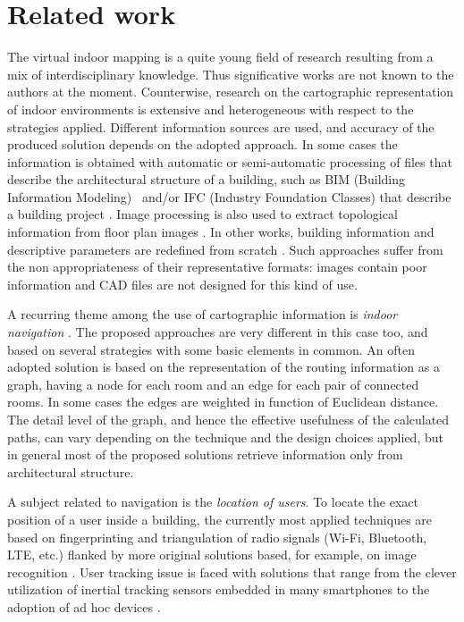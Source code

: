 \section{Related work}\label{related-work}

The virtual indoor mapping is a quite young field of research resulting from a mix of interdisciplinary knowledge. Thus significative works are not known to the authors at  the moment. Counterwise, research on the cartographic representation of indoor environments is
extensive and heterogeneous with respect to the strategies
applied. Different information sources are used, and accuracy of the
produced solution depends on the adopted approach. In some cases the
information is obtained with automatic or semi-automatic processing of files
that describe the architectural structure of a building, such as BIM (Building Information Modeling)~\cite{Eastman:2008:BHG:1796500} and/or IFC (Industry Foundation Classes) that describe a building project \cite{6816739}. Image processing is also used to
extract topological information from floor plan images \cite{6878152}. In
other works, building information and descriptive parameters are redefined
from scratch \cite{6418876}. Such approaches suffer from the non appropriateness of
their representative formats: images contain poor information and CAD
files are not designed for this kind of use. 

A recurring theme among the use
of cartographic information is \emph{indoor navigation}
\cite{6878152,6418876,6816739}. The proposed approaches are very different in
this case too, and based on several strategies with some basic elements in
common. An often adopted solution is based on the representation of the
routing information as a graph, having a node for each room and an edge for
each pair of connected rooms. In some cases the edges are weighted in
function of Euclidean distance. The detail level of the graph, and hence the
effective usefulness of the calculated paths, can vary depending on the
technique and the design choices applied, but in general most of the proposed
solutions retrieve information only from architectural structure. 

A subject related to navigation is the \emph{location of users}. To locate the exact position of a user inside a
building, the currently most applied techniques are based on fingerprinting and
triangulation of radio signals (Wi-Fi, Bluetooth, LTE, etc.) flanked by more
original solutions based, for example, on image recognition \cite{6815564}.
User tracking issue is faced with solutions that range from the clever
utilization of inertial tracking sensors embedded in many smartphones
\cite{6815564} to the adoption of ad hoc devices \cite{6878152}.

